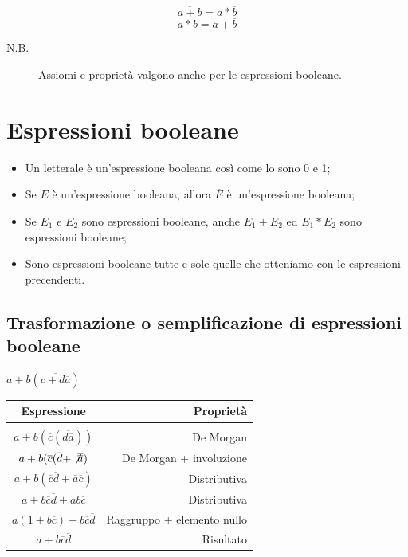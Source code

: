 \begin{definition}
    \begin{equation}
        \overline{a+b}=\overline{a}*\overline{b}
    \end{equation}
    \begin{equation*}
        \overline{a*b}=\overline{a}+\overline{b}
    \end{equation*}
\end{definition}

\begin{description}
    \item[N.B.] Assiomi e proprietà valgono anche per le espressioni booleane.
\end{description}

\section{Espressioni booleane}
\begin{itemize}
    \item Un letterale è un'espressione booleana così come lo sono 0 e 1;
    \item Se $E$ è un'espressione booleana, allora $\overline{E}$ è un'espressione booleana;
    \item Se $E_1$ e $E_2$ sono espressioni booleane, anche $E_1+E_2$ ed $E_1*E_2$ sono espressioni booleane;
    \item Sono espressioni booleane tutte e sole quelle che otteniamo con le espressioni precendenti.
\end{itemize}

\subsection{Trasformazione o semplificazione di espressioni booleane}
\begin{exercise}
    $a+b(\overline{c+d\overline{a}})$\\
    \begin{center}
    \begin{tabular}{c r}
        Espressione & Proprietà\\\hline\\
         $a+b(\overline{c}(\overline{d\overline{a}}))$ & De Morgan\\
         $a+b(\overline{c}(\overline{d}+\not\overline{\overline{a}})$ & De Morgan + involuzione\\
         $a+b(\overline{c}\overline{d}+\overline{a}\overline{c})$ & Distributiva\\
         $a+b\overline{c}\overline{d}+ab\overline{c}$ & Distributiva\\
         $a(1+b\overline{c})+b\overline{c}\overline{d}$ & Raggruppo + elemento nullo\\
         $a+b\overline{c}\overline{d}$ & Risultato
    \end{tabular}
    \end{center}
\end{exercise}

